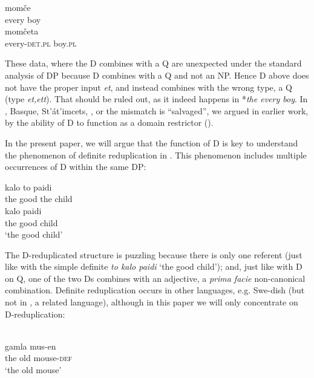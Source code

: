 \documentclass[output=paper,
modfonts
]{langscibook}
\begin{document}
\ea\label{ex:etxeberria:12}
 \citep{schurcks2014}
\ea\label{ex:etxeberria:12a}
 {momče}\\
every boy\\
\ex\label{ex:etxeberria:12b}
 {momčeta}\\
every-\textsc{det.pl} boy.\textsc{pl}\\
\z
\z

These data, where the D combines with a Q are unexpected under the standard analysis of DP because D combines with a Q and not an NP. Hence D above does not have the proper input \textit{et}, and instead combines with the wrong type, a Q (type \textit{et,ett}). That should be ruled out, as it indeed happens in  *\textit{the every boy}. In , Basque, St'\'at'imcets, , or  the mismatch is ``salvaged'', we argued in earlier work, by the ability of D to function as a domain restrictor (\citealt{Giannakidou2004, etxeberria2005, etxeberria-giannakidou2009, etxeberria-giannakidou2014}).

In the present paper, we will argue that the  function of D is key to understand the phenomenon of definite reduplication in . This phenomenon includes multiple occurrences of D within the same DP: 

\ea\label{ex:etxeberria:13}
\ea\label{ex:etxeberria:13a}
 {kalo} {to} {paidi}\\
the good the child\\
\ex\label{ex:etxeberria:13b} 
 {kalo} {paidi}\\
the good child\\
\glt `the good child'
\z
\z

The D-reduplicated structure is puzzling because there is only one referent (just like with the simple definite \textit{to kalo paidi} `the good child'); and, just like with D on Q, one of the two Ds combines with an adjective, a \textit{prima facie} non-canonical combination. Definite reduplication occurs in other languages, e.g. Swe\hyp{}dish (but not in , a related language), although in this paper we will only concentrate on  D-reduplication:

\ea\label{ex:etxeberria:14}
	 \\
	 {gamla} {mus-en}\\ 
	the old mouse-\textsc{def}\\
	\glt `the old mouse'
\z
\end{document}
